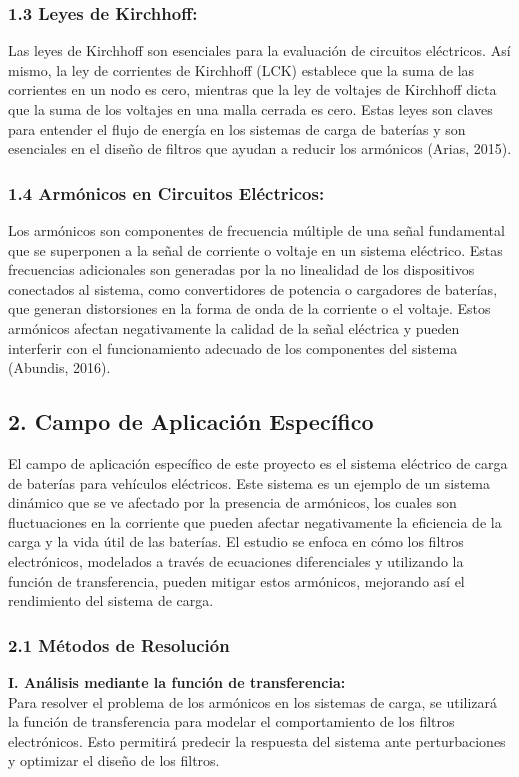 \subsubsection*{1.3 Leyes de Kirchhoff:}
Las leyes de Kirchhoff son esenciales para la evaluación de circuitos eléctricos. Así mismo,
la ley de corrientes de Kirchhoff (LCK) establece que la suma de las corrientes en un nodo es
cero, mientras que la ley de voltajes de Kirchhoff dicta que la suma de los voltajes en una
malla cerrada es cero. Estas leyes son claves para entender el flujo de energía en los sistemas
de carga de baterías y son esenciales en el diseño de filtros que ayudan a reducir los
armónicos (Arias, 2015).
\newpage
\subsubsection*{1.4 Armónicos en Circuitos Eléctricos:}
Los armónicos son componentes de frecuencia múltiple de una señal fundamental que se
superponen a la señal de corriente o voltaje en un sistema eléctrico. Estas frecuencias
adicionales son generadas por la no linealidad de los dispositivos conectados al sistema,
como convertidores de potencia o cargadores de baterías, que generan distorsiones en la
forma de onda de la corriente o el voltaje. Estos armónicos afectan negativamente la calidad
de la señal eléctrica y pueden interferir con el funcionamiento adecuado de los componentes
del sistema (Abundis, 2016).

\subsection*{2. Campo de Aplicación Específico}
El campo de aplicación específico de este proyecto es el sistema eléctrico de carga de
baterías para vehículos eléctricos. Este sistema es un ejemplo de un sistema dinámico que se
ve afectado por la presencia de armónicos, los cuales son fluctuaciones en la corriente que
pueden afectar negativamente la eficiencia de la carga y la vida útil de las baterías. El estudio
se enfoca en cómo los filtros electrónicos, modelados a través de ecuaciones diferenciales y
utilizando la función de transferencia, pueden mitigar estos armónicos, mejorando así el
rendimiento del sistema de carga.

\subsubsection*{2.1 Métodos de Resolución}

\textbf{I. Análisis mediante la función de transferencia:}\\
Para resolver el problema de los armónicos en los sistemas de carga, se utilizará la
función de transferencia para modelar el comportamiento de los filtros electrónicos.
Esto permitirá predecir la respuesta del sistema ante perturbaciones y optimizar el
diseño de los filtros.

